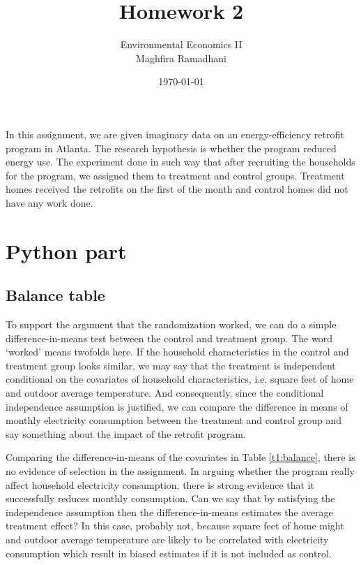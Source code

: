 \documentclass{article}
\begin{document}
 
\title{Homework 2}
\author{Environmental Economics II\\
Maghfira Ramadhani}
\date{\today}
\maketitle

In this assignment, we are given imaginary data on an energy-efficiency retrofit program in Atlanta. The research hypothesis is whether the program reduced energy use. The experiment done in such way that after recruiting the households for the program, we assigned them to treatment and control groups. Treatment homes received the retrofits on the first of the month and control homes did not have any work done.

\section{Python part}
\subsection{Balance table}

To support the argument that the randomization worked, we can do a simple difference-in-means test between the control and treatment group. The word `worked' means twofolds here. If the household characteristics in the control and treatment group looks similar, we may say that the treatment is independent conditional on the covariates of household characteristics, i.e. square feet of home and outdoor average temperature. And consequently, since the conditional independence assumption is justified, we can compare the difference in means of monthly electricity consumption between the treatment and control group and say something about the impact of the retrofit program. 

Comparing the difference-in-means of the covariates in Table \ref{t1:balance}, there is no evidence of selection in the assignment. In arguing whether the program really affect household electricity consumption, there is strong evidence that it successfully reduces monthly consumption. Can we say that by satisfying the independence assumption then the difference-in-means estimates the average treatment effect? In this case, probably not, because square feet of home might and outdoor average temperature are likely to be correlated with electricity consumption which result in biased estimates if it is not included as control.
\end{document}
